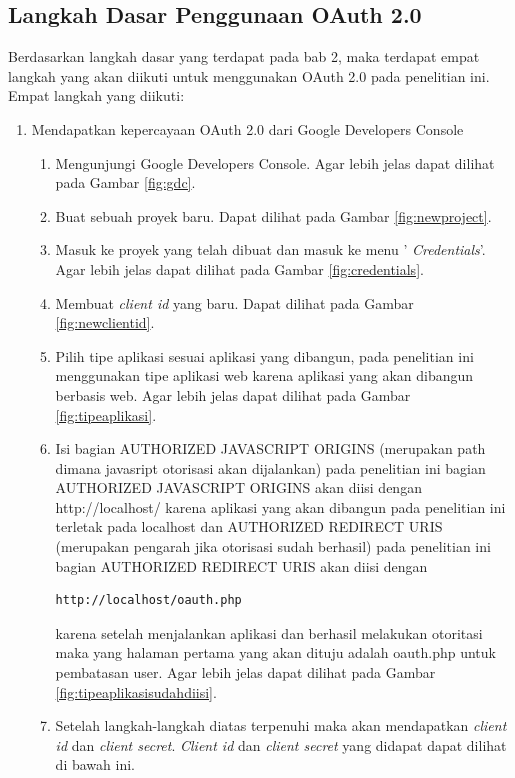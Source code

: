 \subsection{Langkah Dasar Penggunaan OAuth 2.0}
Berdasarkan langkah dasar yang terdapat pada bab 2, maka terdapat empat langkah
yang akan diikuti untuk menggunakan OAuth 2.0 pada penelitian ini. Empat langkah
yang diikuti:
\begin{enumerate}[(1)]
\item Mendapatkan kepercayaan OAuth 2.0 dari Google Developers Console\\
    \begin{enumerate}
    \item Mengunjungi Google Developers Console. Agar lebih jelas dapat dilihat pada Gambar \ref{fig:gdc}.
    \item Buat sebuah proyek baru. Dapat dilihat pada Gambar \ref{fig:newproject}.
    \item Masuk ke proyek yang telah dibuat dan masuk ke menu '{\it
    Credentials}'. Agar lebih jelas dapat dilihat pada Gambar \ref{fig:credentials}.
    \item Membuat {\it client id} yang baru. Dapat dilihat pada Gambar \ref{fig:newclientid}.
    \item Pilih tipe aplikasi sesuai aplikasi yang dibangun, pada penelitian ini menggunakan tipe aplikasi web karena aplikasi yang akan dibangun berbasis web. Agar lebih jelas dapat dilihat pada Gambar \ref{fig:tipeaplikasi}.
    \item Isi bagian AUTHORIZED JAVASCRIPT ORIGINS (merupakan path dimana javasript otorisasi akan dijalankan) pada penelitian ini bagian AUTHORIZED JAVASCRIPT ORIGINS akan diisi dengan http://localhost/ karena aplikasi yang akan dibangun pada penelitian ini terletak pada localhost dan AUTHORIZED REDIRECT URIS (merupakan pengarah jika otorisasi sudah berhasil) pada penelitian ini bagian AUTHORIZED REDIRECT URIS akan diisi dengan
    \begin{lstlisting}[basicstyle=\footnotesize]
http://localhost/oauth.php
    \end{lstlisting}
    karena setelah menjalankan aplikasi dan berhasil melakukan otoritasi maka yang halaman pertama yang akan dituju adalah oauth.php untuk pembatasan user. Agar lebih jelas dapat dilihat pada Gambar \ref{fig:tipeaplikasisudahdiisi}.
    \item Setelah langkah-langkah diatas terpenuhi maka akan mendapatkan {\it client id} dan {\it client secret}. {\it Client id} dan {\it client secret} yang didapat dapat dilihat di bawah ini.

\end{enumerate}
\end{enumerate}
